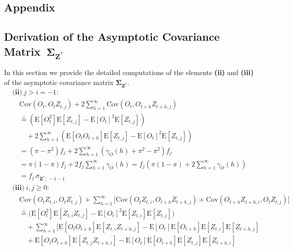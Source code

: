 ﻿\documentclass[12pt,a4paper]{scrreprt}
\theoremstyle{definition}
\begin{document}
\begin{appendices}


\chapter{Appendix}
\section{Derivation of the Asymptotic Covariance Matrix~$\boldsymbol{\Sigma}_{\boldsymbol{Z}^{*}}$}
\label{app:derivation_covarianceZ}
In this section we provide the detailed computations of the elements \textbf{(ii)} and \textbf{(iii)} of the asymptotic covariance matrix $\boldsymbol{\Sigma}_{\boldsymbol{Z}^{*}}$.
\begin{align*}
    &\textbf{(ii)}\ j > i = -1: \\
    &\quad \mathrm{Cov}(O_t, O_t  Z_{t,j}) 
    + 2\sum_{h=1}^\infty \mathrm{Cov}(O_t, O_{t+h}Z_{t+h, j}) \\
    &\quad \overset{\perp}{=} 
    \left(\mathrm{E}[O_t^2]\mathrm{E}[Z_{t,j}] - \mathrm{E}[O_t]^2\mathrm{E}[Z_{t,j}]\right) \\
    &\qquad + 2\sum_{h=1}^{\infty}
    \left(\mathrm{E}[O_tO_{t+h}]\mathrm{E}[Z_{t,j}] 
    - \mathrm{E}[O_t]^2\mathrm{E}[Z_{t,j}]\right) \\
    &\quad = (\pi - \pi^2)f_j + 2\sum_{h=1}^{\infty}(\gamma_O(h) + \pi^2 - \pi^2)f_j \\
    &\quad = \pi(1-\pi)f_j + 2f_j\sum_{h=1}^{\infty}\gamma_O(h) 
    = f_j\!\left(\pi(1-\pi) + 2\sum_{h=1}^{\infty}\gamma_O(h)\right) \\
    &\quad = f_j\,\sigma_{\boldsymbol{Z}^*;\,-1-1} \\[2ex]
    &\textbf{(iii)}\ i,j \geq 0: \\
    &\quad \mathrm{Cov}(O_t Z_{t,i}, O_t Z_{t,j}) 
    + \sum_{h=1}^{\infty}\bigl[\mathrm{Cov}(O_t Z_{t,i}, O_{t+h} Z_{t+h,j}) 
    + \mathrm{Cov}(O_{t+h}Z_{t+h,i}, O_t Z_{t,j})\bigr] \\
    &\quad \overset{\perp}{=} 
    \bigl(\mathrm{E}[O_t^2]\mathrm{E}[Z_{t,i}Z_{t,j}] - \mathrm{E}[O_t]^2 \mathrm{E}[Z_{t,i}] \mathrm{E}[Z_{t,j}]\bigr) \\
    &\qquad + \sum_{h=1}^{\infty}\bigl[
    \mathrm{E}[O_tO_{t+h}]\mathrm{E}[Z_{t,i}Z_{t+h,j}] - \mathrm{E}[O_t]\mathrm{E}[O_{t+h}] \mathrm{E}[Z_{t,i}] \mathrm{E}[Z_{t+h,j}]\\
    &\qquad + \mathrm{E}[O_t O_{t+h}]\mathrm{E}[Z_{t,j}Z_{t+h, i}] - \mathrm{E}[O_t]\mathrm{E}[O_{t+h}] \mathrm{E}[Z_{t,j}] \mathrm{E}[Z_{t+h, i}]

\end{align*}
\end{appendices}
\end{document}
